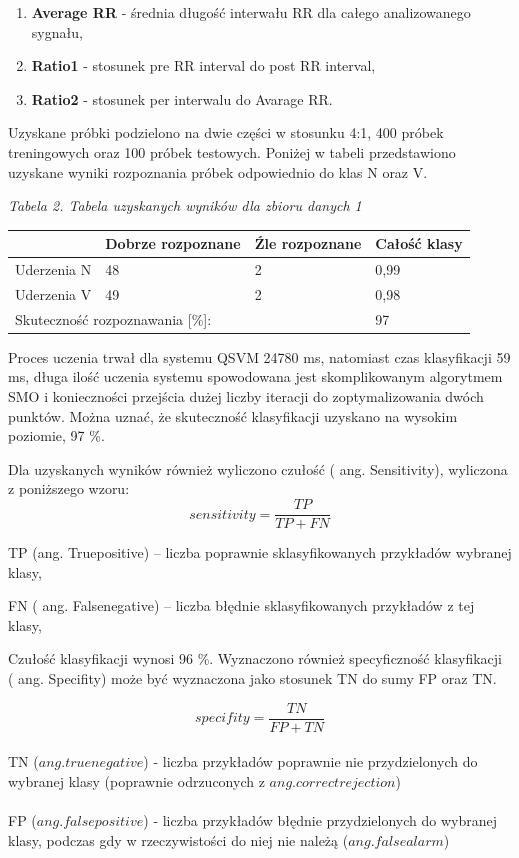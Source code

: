 \documentclass[[10pt,a4paper]{article}
\begin{document}
\begin{enumerate}
\begin{enumerate}
\item  \textbf{Average RR} - średnia długość interwału RR dla całego analizowanego sygnału,

\item  \textbf{Ratio1} - stosunek pre RR interval do post RR interval,

\item  \textbf{Ratio2 }- stosunek per interwalu do Avarage RR.
\end{enumerate}

\noindent Uzyskane próbki podzielono na dwie części w stosunku 4:1, 400 próbek treningowych oraz 100 próbek testowych. Poniżej w tabeli przedstawiono uzyskane wyniki rozpoznania próbek odpowiednio do klas N oraz V.

\textit{Tabela 2. Tabela uzyskanych wyników dla zbioru danych 1}
\newline
\begin{tabular}{|p{1.1in}|p{1.1in}|p{1.1in}|p{1.1in}|} \hline 
 & Dobrze rozpoznane & \'{Z}le rozpoznane & Całość klasy  \\ \hline 
Uderzenia N & 48 & 2 & 0,99 \\ \hline 
Uderzenia V & 49 & 2 & 0,98 \\ \hline 
\multicolumn{3}{|p{1in}|}{Skuteczność rozpoznawania [\%]:} & 97 \\ \hline 
\end{tabular}



\noindent Proces uczenia trwał dla systemu QSVM 24780 ms, natomiast czas klasyfikacji 59 ms, długa ilość uczenia systemu spowodowana jest skomplikowanym algorytmem SMO i konieczności przejścia dużej liczby iteracji do zoptymalizowania dwóch punktów. Można uznać, że skuteczność klasyfikacji uzyskano na wysokim poziomie, 97 \%. 

\noindent Dla uzyskanych wyników również wyliczono czułość ( ang. Sensitivity), wyliczona z poniższego wzoru:
 $$
sensitivity = \frac{TP}{TP + FN}
$$

\noindent TP (ang. Truepositive) -- liczba poprawnie sklasyfikowanych przykładów wybranej klasy,

\noindent FN ( ang. Falsenegative) -- liczba błędnie sklasyfikowanych przykładów z tej klasy,

\noindent Czułość klasyfikacji wynosi 96 \%. Wyznaczono również specyficzność klasyfikacji ( ang. Specifity) może być wyznaczona jako stosunek TN do sumy FP oraz TN.

 $$
specifity = \frac{TN}{FP + TN}
$$
\\
TN ($ang. true negative$) - liczba przykładów poprawnie nie przydzielonych do wybranej klasy (poprawnie odrzuconych z $ang. correct rejection$)\\
\\
FP ($ang. false positive$) - liczba przykładów błędnie przydzielonych do wybranej klasy, podczas gdy w rzeczywistości do niej nie należą ($ang. false alarm$)\\


\end{enumerate}
\end{document}
